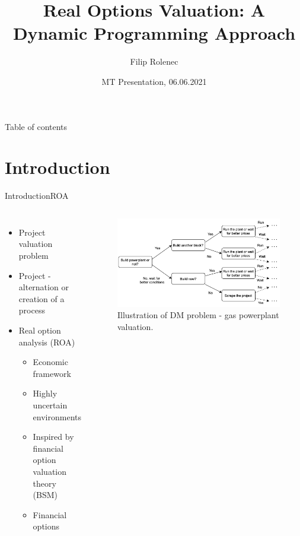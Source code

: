 \documentclass[us]{beamer}
\title{Real Options Valuation: A Dynamic Programming Approach}
\author{Filip Rolenec}
\institute[CTU-FNSPE] %
{
  \inst{}%
  Czech technical university in Prague\\
  FNSPE \\
  Department of Mathematics
 
}
\date{MT Presentation, 06.06.2021}
\begin{document}
\begin{frame}
  \titlepage
\end{frame}

\begin{frame}{Table of contents}
  \tableofcontents
\end{frame}


\section{Introduction}


\begin{frame}{Introduction}{ROA}

	\begin{columns}
 		\begin{itemize}
 			\item {Project valuation problem}
 			\item {Project - alternation or creation of a process}
			\item {Real option analysis (ROA)}
			\begin{itemize}
				\item {Economic framework}
				\item{Highly uncertain environments}
				\item{Inspired by financial option valuation theory (BSM)} 
				\item{Financial options}
			\end{itemize}
		\end{itemize}	
		\begin{figure}
			\includegraphics[scale=0.1]{figures/MT_DTA.png}
			\caption{ Illustration of DM problem - gas powerplant valuation.}
		\end{figure}
\end{columns}	

\end{frame}
\end{document}
